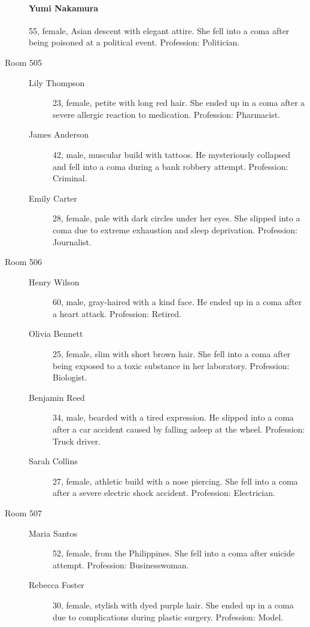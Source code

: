 \documentclass[bg-full]{resources/stylesheets/kult}
\begin{document}
\begin{description}
      \paragraph{Yumi Nakamura} 55, female, Asian descent with elegant attire. She fell into a coma after being poisoned at a political event. Profession: Politician.
  \item[Room 505]
    \begin{description}
      \item[Lily Thompson] 23, female, petite with long red hair. She ended up in a coma after a severe allergic reaction to medication. Profession: Pharmacist.
      \item[James Anderson] 42, male, muscular build with tattoos. He mysteriously collapsed and fell into a coma during a bank robbery attempt. Profession: Criminal.
      \item[Emily Carter] 28, female, pale with dark circles under her eyes. She slipped into a coma due to extreme exhaustion and sleep deprivation. Profession: Journalist.
    \end{description}
  \item[Room 506]
    \begin{description}
      \item[Henry Wilson] 60, male, gray-haired with a kind face. He ended up in a coma after a heart attack. Profession: Retired.
      \item[Olivia Bennett] 25, female, slim with short brown hair. She fell into a coma after being exposed to a toxic substance in her laboratory. Profession: Biologist.
      \item[Benjamin Reed] 34, male, bearded with a tired expression. He slipped into a coma after a car accident caused by falling asleep at the wheel. Profession: Truck driver.
      \item[Sarah Collins] 27, female, athletic build with a nose piercing. She fell into a coma after a severe electric shock accident. Profession: Electrician.
    \end{description}
  \item[Room 507]
    \begin{description}
      \item[Maria Santos] 52, female, from the Philippines. She fell into a coma after suicide attempt. Profession: Businesswoman.
      \item[Rebecca Foster] 30, female, stylish with dyed purple hair. She ended up in a coma due to complications during plastic surgery. Profession: Model.

\end{description}
\end{description}
\end{document}
